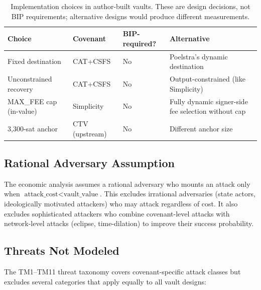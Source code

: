\begin{table}[t]
\centering
\caption{Implementation choices in author-built vaults. These are design decisions,
not BIP requirements; alternative designs would produce different measurements.}
\label{tab:impl_choices}
\small
\begin{tabular}{@{}llll@{}}
\toprule
Choice & Covenant & BIP-required? & Alternative \\
\midrule
Fixed destination        & CAT+CSFS & No  & Poelstra's dynamic destination~\cite{Poe21} \\
Unconstrained recovery   & CAT+CSFS & No  & Output-constrained (like Simplicity) \\
MAX\_FEE cap (in-value) & Simplicity & No & Fully dynamic signer-side fee selection without cap \\
3{,}300-sat anchor       & CTV (upstream) & No & Different anchor size \\
\bottomrule
\end{tabular}
\end{table}

\subsection{Rational Adversary Assumption}

The economic analysis assumes a rational adversary who mounts an attack only when
$\text{attack\_cost} < \text{vault\_value}$. This excludes irrational adversaries
(state actors, ideologically motivated attackers) who may attack regardless of cost.
It also excludes sophisticated attackers who combine covenant-level attacks with
network-level attacks (eclipse, time-dilation) to improve their success probability.

\subsection{Threats Not Modeled} \label{se:threats_not_modeled}

The TM1--TM11 threat taxonomy covers covenant-specific attack classes but excludes
several categories that apply equally to all vault designs:

